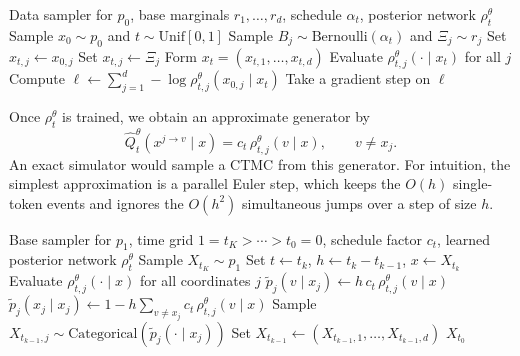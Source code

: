 \documentclass[11pt]{article}
\begin{document}
\begin{algorithm}[H]
  \caption{Training a factorized discrete diffusion model}
  \label{alg:discrete-diffusion-training}
  \begin{algorithmic}[1]
    \Require Data sampler for \(p_0\), base marginals \(r_1,\dots,r_d\), schedule \(\alpha_t\), posterior network \(\rho_t^\theta\)
      \State Sample \(x_0\sim p_0\) and \(t\sim \mathrm{Unif}[0,1]\)
        \State Sample \(B_j\sim \mathrm{Bernoulli}(\alpha_t)\) and \(\Xi_j\sim r_j\)
          \State Set \(x_{t,j}\gets x_{0,j}\)
        \Else
          \State Set \(x_{t,j}\gets \Xi_j\)
        \EndIf
      \EndFor
      \State Form \(x_t=(x_{t,1},\dots,x_{t,d})\)
      \State Evaluate \(\rho_{t,j}^\theta(\cdot\mid x_t)\) for all \(j\)
      \State Compute \(\ell\gets \sum_{j=1}^d -\log \rho_{t,j}^\theta(x_{0,j}\mid x_t)\)
      \State Take a gradient step on \(\ell\)
    \EndFor
  \end{algorithmic}
\end{algorithm}

Once \(\rho_t^\theta\) is trained, we obtain an approximate generator by
\[
  \hat Q_t^\theta(x^{j\to v}\mid x)
  =
  c_t\,\rho_{t,j}^\theta(v\mid x),
  \qquad v\neq x_j.
\]
An exact simulator would sample a CTMC from this generator.
For intuition, the simplest approximation is a parallel Euler step, which keeps the \(O(h)\) single-token events and ignores the \(O(h^2)\) simultaneous jumps over a step of size \(h\).

\begin{algorithm}[H]
  \caption{Euler sampling for the learned CTMC}
  \label{alg:discrete-diffusion-sampling}
  \begin{algorithmic}[1]
    \Require Base sampler for \(p_1\), time grid \(1=t_K>\cdots>t_0=0\), schedule factor \(c_t\), learned posterior network \(\rho_t^\theta\)
    \State Sample \(X_{t_K}\sim p_1\)
      \State Set \(t\gets t_k\), \(h\gets t_k-t_{k-1}\), \(x\gets X_{t_k}\)
      \State Evaluate \(\rho_{t,j}^\theta(\cdot\mid x)\) for all coordinates \(j\)
          \State \(\tilde p_j(v\mid x_j)\gets h\,c_t\,\rho_{t,j}^\theta(v\mid x)\)
        \EndFor
        \State \(\tilde p_j(x_j\mid x_j)\gets 1-h\sum_{v\neq x_j} c_t\,\rho_{t,j}^\theta(v\mid x)\)
        \State Sample \(X_{t_{k-1},j}\sim \mathrm{Categorical}(\tilde p_j(\cdot\mid x_j))\)
      \EndFor
      \State Set \(X_{t_{k-1}}\gets (X_{t_{k-1},1},\dots,X_{t_{k-1},d})\)
    \EndFor
    \State \Return \(X_{t_0}\)
  \end{algorithmic}
\end{algorithm}
\end{document}
